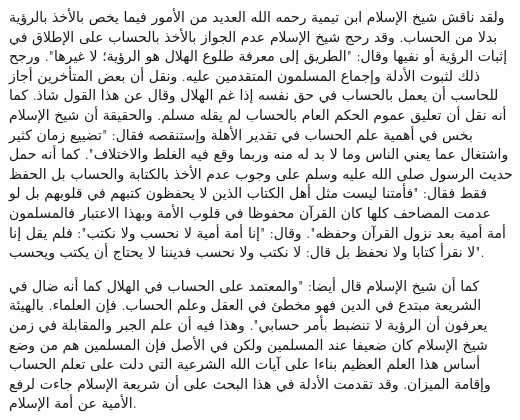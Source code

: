 ولقد ناقش شيخ الإسلام ابن تيمية رحمه الله العديد من الأمور فيما يخص بالأخذ بالرؤية بدلا من الحساب. وقد رحج شيخ الإسلام عدم الجواز بالأخذ بالحساب على الإطلاق في إثبات الرؤية أو نفيها وقال: "الطريق إلى معرفة طلوع الهلال هو الرؤية؛ لا غيرها". ورجح ذلك لثبوت الأدلة وإجماع المسلمون المتقدمين عليه. ونقل أن بعض المتأخرين أجاز للحاسب أن يعمل بالحساب في حق نفسه إذا غم الهلال وقال عن هذا القول شاذ. كما أنه نقل أن تعليق عموم الحكم العام بالحساب لم يقله مسلم. والحقيقة أن شيخ الإسلام بخس في أهمية علم الحساب في تقدير الأهلة وإستنقصه فقال: "تضييع زمان كثير واشتغال عما يعني الناس وما لا بد له منه وربما وقع فيه الغلط والاختلاف". كما أنه حمل حديث الرسول صلى الله عليه وسلم على وجوب عدم الأخذ بالكتابة والحساب بل الحفظ فقط فقال: "فأمتنا ليست مثل أهل الكتاب الذين لا يحفظون كتبهم في قلوبهم بل لو عدمت المصاحف كلها كان القرآن محفوظا في قلوب الأمة وبهذا الاعتبار فالمسلمون أمة أمية بعد نزول القرآن وحفظه". وقال: "إنا أمة أمية لا نحسب ولا نكتب": فلم يقل إنا لا نقرأ كتابا ولا نحفظ بل قال: لا نكتب ولا نحسب فديننا لا يحتاج أن يكتب ويحسب".

كما أن شيخ الإسلام قال أيضا: "والمعتمد على الحساب في الهلال كما أنه ضال في الشريعة مبتدع في الدين فهو مخطئ في العقل وعلم الحساب. فإن العلماء. بالهيئة يعرفون أن الرؤية لا تنضبط بأمر حسابي". وهذا فيه أن علم الجبر والمقابلة في زمن شيخ الإسلام كان ضعيفا عند المسلمين ولكن في الأصل فإن المسلمين هم من وضع أساس هذا العلم العظيم بناءا على آيات الله الشرعية التي دلت على تعلم الحساب وإقامة الميزان. وقد تقدمت الأدلة في هذا البحث على أن شريعة الإسلام جاءت لرفع الأمية عن أمة الإسلام. 


